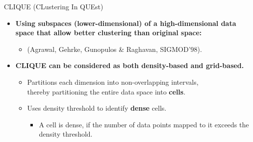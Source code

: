 \begin{frame}{CLIQUE (CLustering In QUEst)}
	\begin{itemize}
		\item \textbf{Using {\color{airforceblue}subspaces} (lower-dimensional)
			      of a high-dimensional data space that allow better clustering than
			      original space:}
		      \begin{itemize}
			      \item (Agrawal, Gehrke, Gunopulos \& Raghavan, SIGMOD'98).
		      \end{itemize}
		\item \textbf{CLIQUE can be considered as both density-based and
			      grid-based.}
		      \begin{itemize}
			      \item Partitions each dimension into non-overlapping intervals, \\
			            thereby partitioning the entire data space into \textbf{cells}.
			      \item Uses density threshold to identify \textbf{dense} cells.
			            \begin{itemize}
				            \item A cell is dense, if the number of data points mapped to
				                  it exceeds the density threshold.
			            \end{itemize}
		      \end{itemize}
	\end{itemize}
\end{frame}

